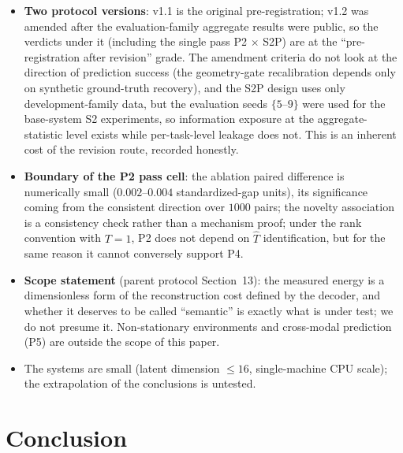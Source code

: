\documentclass{article}
\begin{document}
\begin{itemize}
\item \textbf{Two protocol versions}: v1.1 is the original pre-registration; v1.2
was amended after the evaluation-family aggregate results were public, so the
verdicts under it (including the single pass P2 $\times$ S2P) are at the
``pre-registration after revision'' grade. The amendment criteria do not look at
the direction of prediction success (the geometry-gate recalibration depends only
on synthetic ground-truth recovery), and the S2P design uses only
development-family data, but the evaluation seeds $\{5$--$9\}$ were used for the
base-system S2 experiments, so information exposure at the aggregate-statistic
level exists while per-task-level leakage does not. This is an inherent cost of
the revision route, recorded honestly.
\item \textbf{Boundary of the P2 pass cell}: the ablation paired difference is
numerically small ($0.002$--$0.004$ standardized-gap units), its significance
coming from the consistent direction over $1000$ pairs; the novelty association
is a consistency check rather than a mechanism proof; under the rank convention
with $T=1$, P2 does not depend on $\hat T$ identification, but for the same
reason it cannot conversely support P4.
\item \textbf{Scope statement} (parent protocol Section~13): the measured energy
is a dimensionless form of the reconstruction cost defined by the decoder, and
whether it deserves to be called ``semantic'' is exactly what is under test; we
do not presume it. Non-stationary environments and cross-modal prediction (P5)
are outside the scope of this paper.
\item The systems are small (latent dimension $\le 16$, single-machine CPU
scale); the extrapolation of the conclusions is untested.
\end{itemize}

\section{Conclusion}
\end{document}
